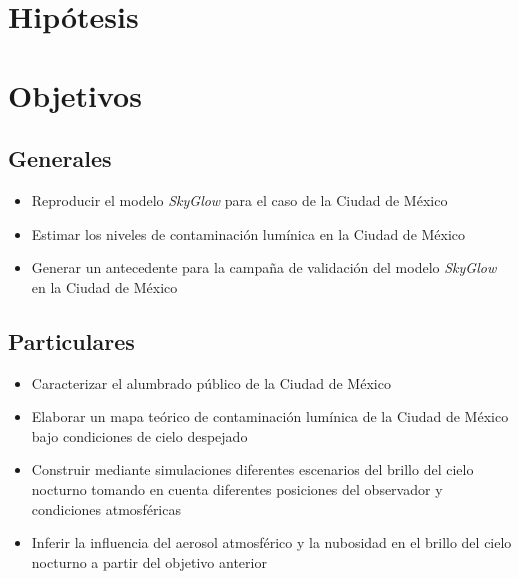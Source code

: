 \section{Hipótesis}

\section{Objetivos}

\subsection{Generales}

\begin{itemize}

    \item Reproducir el modelo \textit{SkyGlow} para el caso de la Ciudad de México
    
    \item Estimar los niveles de contaminación lumínica en la Ciudad de México 
    
    \item Generar un antecedente para la campaña de validación del modelo \textit{SkyGlow} en la Ciudad de México
    
\end{itemize}

\subsection{Particulares}

\begin{itemize}

    \item Caracterizar el alumbrado público de la Ciudad de México 
    
    \item Elaborar un mapa teórico de contaminación lumínica de la Ciudad de México bajo condiciones de cielo despejado
    
    \item Construir mediante simulaciones diferentes escenarios del brillo del cielo nocturno tomando en cuenta diferentes posiciones del observador y condiciones atmosféricas
    
    \item Inferir la influencia del aerosol atmosférico  y la nubosidad en el brillo del cielo nocturno a partir del objetivo anterior
    
    
\end{itemize}